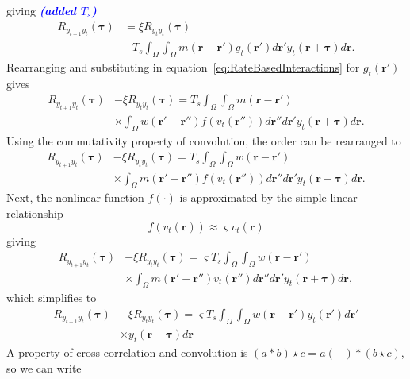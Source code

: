 \documentclass[conference]{IEEEtran}
\newcommand{\parham}[1]{\textsf{\emph{\textbf{\textcolor{blue}{#1}}}}}
\begin{document}
giving \parham{(added $T_s$)}
\begin{align}
	R_{y_{t+1}y_t}(\boldsymbol{\tau}) &= \xi R_{y_ty_t}(\boldsymbol{\tau}) \nonumber \\
	&+ T_s \int_{\Omega}\int_{\Omega} m(\mathbf{r}-\mathbf{r}')  g_t(\mathbf{r}') d\mathbf{r}' y_t(\mathbf{r}+\boldsymbol{\tau}) d\mathbf{r}.
\end{align}
Rearranging and substituting in equation~\ref{eq:RateBasedInteractions} for $g_t(\mathbf{r}')$ gives
\begin{align}
	R_{y_{t+1}y_t}(\boldsymbol{\tau}) &-\xi R_{y_ty_t}(\boldsymbol{\tau}) = T_s \int_{\Omega}\int_{\Omega} m(\mathbf{r}-\mathbf{r}') \nonumber \\
	&\times \int_{\Omega} w(\mathbf{r}'-\mathbf{r}'') f\left(v_t(\mathbf{r}'')\right)d\mathbf{r}'' d\mathbf{r}' y_t(\mathbf{r}+\boldsymbol{\tau}) d\mathbf{r}. 
\end{align}  
Using the commutativity property of convolution, the order can be rearranged to
\begin{align}
	R_{y_{t+1}y_t}(\boldsymbol{\tau})&-\xi R_{y_ty_t}(\boldsymbol{\tau}) =  T_s \int_{\Omega}\int_{\Omega} w(\mathbf{r}-\mathbf{r}') \nonumber \\
	&\times \int_{\Omega} m(\mathbf{r}'-\mathbf{r}'') f\left(v_t(\mathbf{r}'')\right) d\mathbf{r}'' d\mathbf{r}' y_t(\mathbf{r}+\boldsymbol{\tau}) d\mathbf{r}.
\end{align}
Next, the nonlinear function $f(\cdot)$ is approximated by the simple linear relationship
\begin{equation}
	f\left(v_t(\mathbf{r})\right) \approx \varsigma v_t(\mathbf{r})
\end{equation} 
giving
\begin{align}
	R_{y_{t+1}y_t}(\boldsymbol{\tau})&-\xi R_{y_ty_t}(\boldsymbol{\tau}) =  \varsigma T_s \int_{\Omega}\int_{\Omega} w(\mathbf{r}-\mathbf{r}') \nonumber \\
	&\times \int_{\Omega} m(\mathbf{r}'-\mathbf{r}'')  v_t(\mathbf{r}'') d\mathbf{r}'' d\mathbf{r}' y_t(\mathbf{r}+\boldsymbol{\tau}) d\mathbf{r},
\end{align}
which simplifies to
\begin{align}
	R_{y_{t+1}y_t}(\boldsymbol{\tau})&-\xi R_{y_ty_t}(\boldsymbol{\tau}) =  \varsigma T_s \int_{\Omega}\int_{\Omega} w(\mathbf{r}-\mathbf{r}')y_t(\mathbf{r}') d\mathbf{r}' \nonumber \\
	&\times y_t(\mathbf{r}+\boldsymbol{\tau}) d\mathbf{r}
\end{align}
A property of cross-correlation and convolution is $(a \ast b) \star c = a(-)\ast(b \star c)$, so we can write
\end{document}
